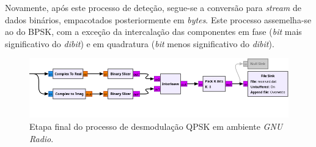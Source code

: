 Novamente, após este processo de deteção, segue-se a conversão para \textit{stream} de dados binários, empacotados posteriormente em \textit{bytes}. Este processo assemelha-se ao do BPSK, com a exceção da intercalação das componentes em fase (\textit{bit} mais significativo do \textit{dibit}) e em quadratura (\textit{bit} menos significativo do \textit{dibit}).  

\begin{figure}[H]
    \centering
    \includegraphics[width = 0.85\linewidth]{img/intro/QPSK_demod.png}
    \caption{Etapa final do processo de desmodulação QPSK em ambiente \textit{GNU Radio}.}
    \label{fig:qpsk-demod}
\end{figure}

\noindent{}